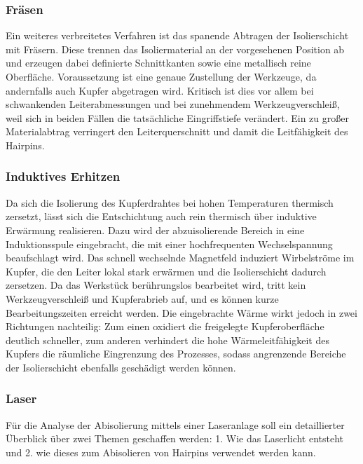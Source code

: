 \subsubsection{Fräsen}\label{sec:Fraesen}
Ein weiteres verbreitetes Verfahren ist das spanende Abtragen der Isolierschicht mit
Fräsern. Diese trennen das Isoliermaterial an der vorgesehenen Position ab und
erzeugen dabei definierte Schnittkanten sowie eine metallisch reine Oberfläche.
Voraussetzung ist eine genaue Zustellung der Werkzeuge, da andernfalls auch Kupfer
abgetragen wird. Kritisch ist dies vor allem bei schwankenden Leiterabmessungen und
bei zunehmendem Werkzeugverschleiß, weil sich in beiden Fällen die tatsächliche
Eingriffstiefe verändert. Ein zu großer Materialabtrag verringert den
Leiterquerschnitt und damit die Leitfähigkeit des
Hairpins.
%
\subsubsection{Induktives Erhitzen}\label{sec:InduktivesErhitzen}
Da sich die Isolierung des Kupferdrahtes bei hohen Temperaturen thermisch zersetzt,
lässt sich die Entschichtung auch rein thermisch über induktive Erwärmung
realisieren. Dazu wird der abzuisolierende Bereich in eine Induktionsspule
eingebracht, die mit einer hochfrequenten Wechselspannung beaufschlagt wird. Das
schnell wechselnde Magnetfeld induziert Wirbelströme im Kupfer, die den Leiter lokal
stark erwärmen und die Isolierschicht dadurch zersetzen. Da das Werkstück
berührungslos bearbeitet wird, tritt kein Werkzeugverschleiß und Kupferabrieb auf, und es können kurze
Bearbeitungszeiten erreicht werden. Die eingebrachte Wärme wirkt jedoch in zwei Richtungen
nachteilig: Zum einen oxidiert die freigelegte Kupferoberfläche deutlich schneller,
zum anderen verhindert die hohe Wärmeleitfähigkeit des Kupfers die räumliche
Eingrenzung des Prozesses, sodass angrenzende Bereiche der Isolierschicht ebenfalls
geschädigt werden können.
%
\subsubsection{Laser}\label{sec:Laser}
Für die Analyse der Abisolierung mittels einer Laseranlage soll ein detaillierter Überblick über zwei Themen geschaffen werden: 1. Wie das Laserlicht entsteht
und 2. wie dieses zum Abisolieren von Hairpins verwendet werden kann.

